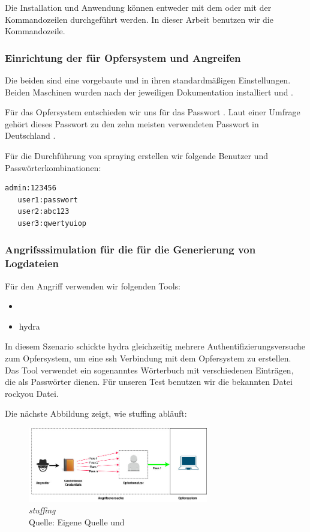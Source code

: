 Die Installation und Anwendung können entweder mit dem  oder mit der Kommandozeilen durchgeführt werden. In dieser Arbeit benutzen wir die Kommandozeile. 

\newpage
\subsubsection{Einrichtung der  für Opfersystem und Angreifen}
Die beiden  sind eine vorgebaute  und  in ihren standardmäßigen Einstellungen. Beiden Maschinen wurden nach der jeweiligen Dokumentation installiert \citep{kali_vm} und \citep{Ubuntu_server}.

Für das Opfersystem entschieden wir uns für das Passwort . Laut einer Umfrage gehört dieses Passwort zu den zehn meisten verwendeten Passwort in Deutschland \citep{silicon_passwort}.  

Für die Durchführung von \gls{spraying} erstellen wir folgende Benutzer und Passwörterkombinationen:

{
\begin{Verbatim}[frame=single]
   admin:123456
   user1:passwort
   user2:abc123
   user3:qwertyuiop
\end{Verbatim}
}

\subsubsection{Angrifsssimulation für die für die Generierung von Logdateien}
Für den Angriff verwenden wir folgenden Tools:
\begin{itemize}[noitemsep]
   \item	{}
   \item \gls{hydra}
\end{itemize}

In diesem Szenario schickte \gls{hydra} gleichzeitig mehrere Authentifizierungsversuche zum Opfersystem, um eine \gls{ssh} Verbindung mit dem Opfersystem zu erstellen. Das Tool verwendet ein sogenanntes Wörterbuch mit verschiedenen Einträgen, die als Passwörter dienen. Für unseren Test benutzen wir die bekannten Datei \gls{rockyou} Datei. 

\newpage
Die nächste Abbildung zeigt, wie \gls{stuffing} abläuft:

\begin{figure}[H]
   \centering
   \includegraphics[width=0.7\textwidth]{assets/Stuffing.jpg}
   \caption{\textit{\gls{stuffing}}\\Quelle: Eigene Quelle und \citep{Nguyen_stuffing}}
   \centering
\end{figure}


